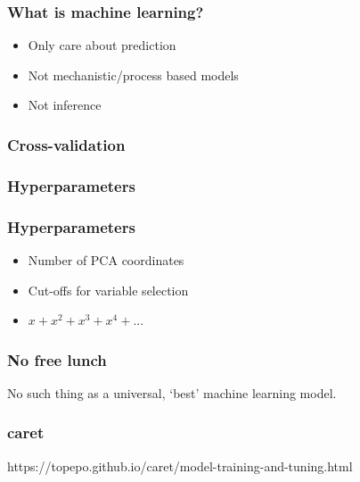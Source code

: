 \documentclass{beamer}
\begin{document}
\begin{frame}
\frametitle{What is machine learning?}
\begin{itemize}
\item Only care about prediction
\item Not mechanistic/process based models
\item Not inference
\end{itemize}
\end{frame} 



\begin{frame}
\frametitle{Cross-validation}
\begin{figure}
\end{figure} 
\end{frame} 


\begin{frame}
\frametitle{Hyperparameters}
\begin{figure}
\end{figure} 
\end{frame} 


\begin{frame}
\frametitle{Hyperparameters}
\begin{itemize}
\item Number of PCA coordinates
\item Cut-offs for variable selection
\item $x + x^2 + x^3 + x^4 + ...$
\end{itemize}
\end{frame} 



\begin{frame}
\frametitle{No free lunch}
No such thing as a universal, `best' machine learning model.
\end{frame} 



\begin{frame}
\frametitle{caret}
https://topepo.github.io/caret/model-training-and-tuning.html
\end{frame} 
\end{document}

